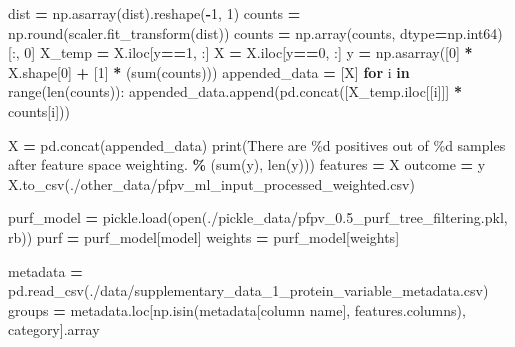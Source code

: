 \documentclass[
  11pt,
  oneside]{book}
\newenvironment{Shaded}{\begin{snugshade}}{\end{snugshade}}
\newcommand{\BuiltInTok}[1]{#1}
\newcommand{\ControlFlowTok}[1]{\textcolor[rgb]{0.13,0.29,0.53}{\textbf{#1}}}
\newcommand{\DecValTok}[1]{\textcolor[rgb]{0.00,0.00,0.81}{#1}}
\newcommand{\KeywordTok}[1]{\textcolor[rgb]{0.13,0.29,0.53}{\textbf{#1}}}
\newcommand{\NormalTok}[1]{#1}
\newcommand{\OperatorTok}[1]{\textcolor[rgb]{0.81,0.36,0.00}{\textbf{#1}}}
\newcommand{\SpecialCharTok}[1]{\textcolor[rgb]{0.00,0.00,0.00}{#1}}
\newcommand{\StringTok}[1]{\textcolor[rgb]{0.31,0.60,0.02}{#1}}
\begin{document}
\begin{Shaded}
\begin{Highlighting}[]
\NormalTok{dist }\OperatorTok{=}\NormalTok{ np.asarray(dist).reshape(}\OperatorTok{{-}}\DecValTok{1}\NormalTok{, }\DecValTok{1}\NormalTok{)}
\NormalTok{counts }\OperatorTok{=}\NormalTok{ np.}\BuiltInTok{round}\NormalTok{(scaler.fit\_transform(dist))}
\NormalTok{counts }\OperatorTok{=}\NormalTok{ np.array(counts, dtype}\OperatorTok{=}\NormalTok{np.int64)[:, }\DecValTok{0}\NormalTok{]}
\NormalTok{X\_temp }\OperatorTok{=}\NormalTok{ X.iloc[y}\OperatorTok{==}\DecValTok{1}\NormalTok{, :]}
\NormalTok{X }\OperatorTok{=}\NormalTok{ X.iloc[y}\OperatorTok{==}\DecValTok{0}\NormalTok{, :]}
\NormalTok{y }\OperatorTok{=}\NormalTok{ np.asarray([}\DecValTok{0}\NormalTok{] }\OperatorTok{*}\NormalTok{ X.shape[}\DecValTok{0}\NormalTok{] }\OperatorTok{+}\NormalTok{ [}\DecValTok{1}\NormalTok{] }\OperatorTok{*}\NormalTok{ (}\BuiltInTok{sum}\NormalTok{(counts)))}
\NormalTok{appended\_data }\OperatorTok{=}\NormalTok{ [X]}
\ControlFlowTok{for}\NormalTok{ i }\KeywordTok{in} \BuiltInTok{range}\NormalTok{(}\BuiltInTok{len}\NormalTok{(counts)):}
\NormalTok{    appended\_data.append(pd.concat([X\_temp.iloc[[i]]] }\OperatorTok{*}\NormalTok{ counts[i]))}
    
\NormalTok{X }\OperatorTok{=}\NormalTok{ pd.concat(appended\_data)}
\BuiltInTok{print}\NormalTok{(}\StringTok{\textquotesingle{}There are }\SpecialCharTok{\%d}\StringTok{ positives out of }\SpecialCharTok{\%d}\StringTok{ samples after feature space weighting.\textquotesingle{}} \OperatorTok{\%}\NormalTok{ (}\BuiltInTok{sum}\NormalTok{(y), }\BuiltInTok{len}\NormalTok{(y)))}
\NormalTok{features }\OperatorTok{=}\NormalTok{ X}
\NormalTok{outcome }\OperatorTok{=}\NormalTok{ y}
\NormalTok{X.to\_csv(}\StringTok{\textquotesingle{}./other\_data/pfpv\_ml\_input\_processed\_weighted.csv\textquotesingle{}}\NormalTok{)}

\NormalTok{purf\_model }\OperatorTok{=}\NormalTok{ pickle.load(}\BuiltInTok{open}\NormalTok{(}\StringTok{\textquotesingle{}./pickle\_data/pfpv\_0.5\_purf\_tree\_filtering.pkl\textquotesingle{}}\NormalTok{, }\StringTok{\textquotesingle{}rb\textquotesingle{}}\NormalTok{))}
\NormalTok{purf }\OperatorTok{=}\NormalTok{ purf\_model[}\StringTok{\textquotesingle{}model\textquotesingle{}}\NormalTok{]}
\NormalTok{weights }\OperatorTok{=}\NormalTok{ purf\_model[}\StringTok{\textquotesingle{}weights\textquotesingle{}}\NormalTok{]}

\NormalTok{metadata }\OperatorTok{=}\NormalTok{ pd.read\_csv(}\StringTok{\textquotesingle{}./data/supplementary\_data\_1\_protein\_variable\_metadata.csv\textquotesingle{}}\NormalTok{)}
\NormalTok{groups }\OperatorTok{=}\NormalTok{ metadata.loc[np.isin(metadata[}\StringTok{\textquotesingle{}column name\textquotesingle{}}\NormalTok{], features.columns), }\StringTok{\textquotesingle{}category\textquotesingle{}}\NormalTok{].array}


\end{Highlighting}
\end{Shaded}
\end{document}
